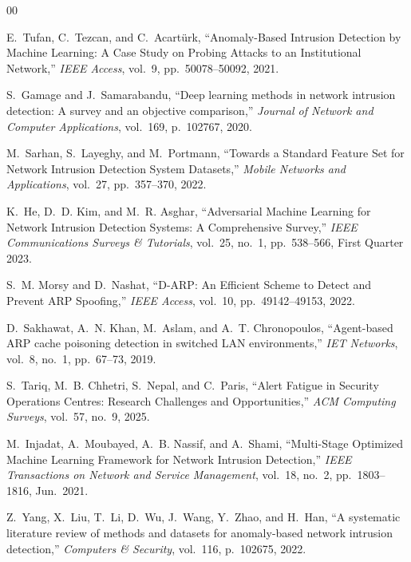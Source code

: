\documentclass[conference]{IEEEtran}
\begin{document}
\begin{thebibliography}{00}


E.~Tufan, C.~Tezcan, and C.~Acartürk,
``Anomaly-Based Intrusion Detection by Machine Learning: A Case Study
on Probing Attacks to an Institutional Network,''
\textit{IEEE Access},
vol.~9, pp.~50078--50092, 2021.

S.~Gamage and J.~Samarabandu,
``Deep learning methods in network intrusion detection: A survey and an
objective comparison,''
\textit{Journal of Network and Computer Applications},
vol.~169, p.~102767, 2020.

M.~Sarhan, S.~Layeghy, and M.~Portmann,
``Towards a Standard Feature Set for Network Intrusion Detection System
Datasets,''
\textit{Mobile Networks and Applications},
vol.~27, pp.~357--370, 2022.

K.~He, D.~D. Kim, and M.~R. Asghar,
``Adversarial Machine Learning for Network Intrusion Detection Systems:
A Comprehensive Survey,''
\textit{IEEE Communications Surveys \& Tutorials},
vol.~25, no.~1, pp.~538--566, First Quarter 2023.

S.~M. Morsy and D.~Nashat,
``D-ARP: An Efficient Scheme to Detect and Prevent ARP Spoofing,''
\textit{IEEE Access},
vol.~10, pp.~49142--49153, 2022.

D.~Sakhawat, A.~N. Khan, M.~Aslam, and A.~T. Chronopoulos,
``Agent-based ARP cache poisoning detection in switched LAN
environments,''
\textit{IET Networks},
vol.~8, no.~1, pp.~67--73, 2019.

S.~Tariq, M.~B. Chhetri, S.~Nepal, and C.~Paris,
``Alert Fatigue in Security Operations Centres: Research Challenges
and Opportunities,''
\textit{ACM Computing Surveys},
vol.~57, no.~9, 2025.

M.~Injadat, A.~Moubayed, A.~B. Nassif, and A.~Shami,
``Multi-Stage Optimized Machine Learning Framework for Network
Intrusion Detection,''
\textit{IEEE Transactions on Network and Service Management},
vol.~18, no.~2, pp.~1803--1816, Jun.~2021.

Z.~Yang, X.~Liu, T.~Li, D.~Wu, J.~Wang, Y.~Zhao, and H.~Han,
``A systematic literature review of methods and datasets for
anomaly-based network intrusion detection,''
\textit{Computers \& Security},
vol.~116, p.~102675, 2022.



\end{thebibliography}
\end{document}
